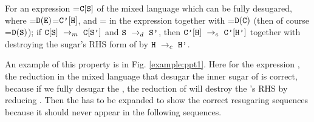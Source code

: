 
\begin{property} \label{thm1}
	For an expression =$\mbox{\tt C}[\mbox{\tt S}]$ of the mixed language which can be fully desugared, where =$\mathtt{D}(\mbox{\tt E})$=$\mbox{\tt C'}[\mbox{\tt H}]$, and = in the expression  together with =$\mathtt{D}(\mbox{\tt C})$ (then of course =$\mathtt{D}(\mbox{\tt S})$); if $\mbox{\tt C}[\mbox{\tt S}] ~\rightarrow_m~\mbox{\tt C}[\mbox{\tt S'}]$ and $\mbox{\tt S} ~\rightarrow_d~ \mbox{\tt S'}$, then $\mbox{\tt C'}[\mbox{\tt H}] ~\rightarrow_c~\mbox{\tt C'}[\mbox{\tt H'}]$ together with destroying the sugar's RHS form of  by $\mbox{\tt H} ~\rightarrow_c~\mbox{\tt H'}$.
\end{property}

An example of this property is in Fig. \ref{example:ppt1}. Here for the expression ,
the reduction in the mixed language that desugar the inner  sugar of 
is correct, because if we fully desugar the , the reduction of  will destroy the 's RHS by reducing .
Then the  has to be expanded to show the correct resugaring sequences because it should never appear in the following sequences.

